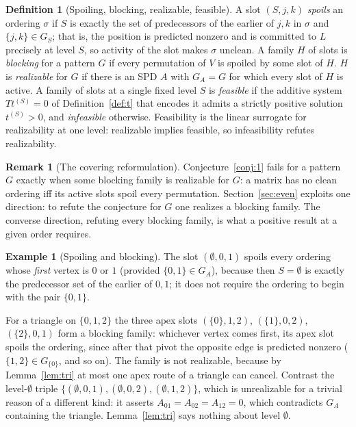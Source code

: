 \documentclass[11pt]{article}
\theoremstyle{plain}
\theoremstyle{definition}
\newtheorem{definition}[theorem]{Definition}
\newtheorem{example}[theorem]{Example}
\newtheorem{remark}[theorem]{Remark}
\begin{document}
\begin{aiblock}
\begin{definition}[Spoiling, blocking, realizable, feasible]\label{def:blocking}
A slot $(S,j,k)$ \emph{spoils} an ordering $\sigma$ if $S$ is exactly the set of predecessors of the
earlier of $j,k$ in $\sigma$ and $\{j,k\}\in G_S$; that is, the position is predicted nonzero and is
committed to $L$ precisely at level $S$, so activity of the slot makes $\sigma$ unclean. A family $H$
of slots is \emph{blocking} for a pattern $G$ if every permutation of $V$ is spoiled by some slot of
$H$. $H$ is \emph{realizable} for $G$ if there is an SPD $A$ with $G_A=G$ for which every slot of $H$
is active. A family of slots at a single fixed level $S$ is \emph{feasible} if the additive system
$Tt^{(S)}=0$ of Definition~\ref{def:t} that encodes it admits a strictly positive solution
$t^{(S)}>0$, and \emph{infeasible} otherwise. Feasibility is the linear surrogate for realizability
at one level: realizable implies feasible, so infeasibility refutes realizability.
\end{definition}

\begin{remark}[The covering reformulation]\label{rem:covering}
Conjecture~\ref{conj:1} fails for a pattern $G$ exactly when some blocking family is realizable for
$G$: a matrix has no clean ordering iff its active slots spoil every permutation.
Section~\ref{sec:even} exploits one direction: to refute the conjecture for $G$ one realizes a
blocking family. The converse direction, refuting every blocking family, is what a positive result at
a given order requires.
\end{remark}

\begin{example}[Spoiling and blocking]\label{ex:spoils}
The slot $(\emptyset,0,1)$ spoils every ordering whose \emph{first} vertex is $0$ or $1$ (provided
$\{0,1\}\in G_A$), because then $S=\emptyset$ is exactly the predecessor set of the earlier of $0,1$;
it does not require the ordering to begin with the pair $\{0,1\}$.

For a triangle on $\{0,1,2\}$ the three apex slots $(\{0\},1,2)$, $(\{1\},0,2)$, $(\{2\},0,1)$ form a
blocking family: whichever vertex comes first, its apex slot spoils the ordering, since after that
pivot the opposite edge is predicted nonzero ($\{1,2\}\in G_{\{0\}}$, and so on). The family is not
realizable, because by Lemma~\ref{lem:tri} at most one apex route of a triangle can cancel. Contrast
the level-$\emptyset$ triple $\{(\emptyset,0,1),(\emptyset,0,2),(\emptyset,1,2)\}$, which is
unrealizable for a trivial reason of a different kind: it asserts $A_{01}=A_{02}=A_{12}=0$, which
contradicts $G_A$ containing the triangle. Lemma~\ref{lem:tri} says nothing about level $\emptyset$.
\end{example}


\end{aiblock}
\end{document}
